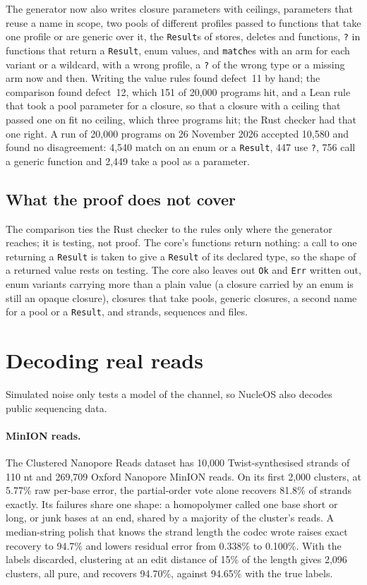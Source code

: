 \documentclass[11pt,a4paper]{article}
\newcommand{\nsl}[1]{\texttt{#1}}
\begin{document}
The generator now also writes closure parameters with ceilings,
parameters that reuse a name in scope, two pools of different profiles
passed to functions that take one profile or are generic over it, the
\nsl{Result}s of stores, deletes and functions, \nsl{?} in functions that
return a \nsl{Result}, enum values, and \nsl{match}es with an arm for
each variant or a wildcard, with a wrong profile, a \nsl{?} of the wrong
type or a missing arm now and then. Writing the value rules found
defect~11 by hand; the comparison found defect~12, which 151 of 20,000
programs hit, and a Lean rule that took a pool parameter for a closure,
so that a closure with a ceiling that passed one on fit no ceiling,
which three programs hit; the Rust checker had that one right.
A run of 20,000 programs on 26 November 2026 accepted 10,580 and found no
disagreement: 4,540 match on an enum or a \nsl{Result}, 447 use \nsl{?},
756 call a generic function and 2,449 take a pool as a parameter.

\subsection{What the proof does not cover}

The comparison ties the Rust checker to the rules only where the
generator reaches; it is testing, not proof. The core's functions return
nothing: a call to one returning a \nsl{Result} is taken to give a
\nsl{Result} of its declared type, so the shape of a returned value
rests on testing. The core also leaves out \nsl{Ok} and \nsl{Err} written
out, enum variants carrying more than a plain value (a closure carried by
an enum is still an opaque closure), closures that take pools, generic
closures, a second name for a pool or a \nsl{Result}, and strands,
sequences and files.

\section{Decoding real reads}
\label{sec:eval}

Simulated noise only tests a model of the channel, so NucleOS also
decodes public sequencing data.

\paragraph{MinION reads.} The Clustered Nanopore Reads dataset
\cite{trellisbma} has 10,000 Twist-synthesised strands of 110 nt and
269,709 Oxford Nanopore MinION reads. On its first 2,000 clusters, at
5.77\% raw per-base error, the partial-order vote alone recovers 81.8\%
of strands exactly. Its failures share one shape: a homopolymer called
one base short or long, or junk bases at an end, shared by a majority of
the cluster's reads. A median-string polish that knows the strand length
the codec wrote raises exact recovery to 94.7\% and lowers residual error
from 0.338\% to 0.100\%. With the labels discarded, clustering at an edit
distance of 15\% of the length gives 2,096 clusters, all pure, and
recovers 94.70\%, against 94.65\% with the true labels.
\end{document}
